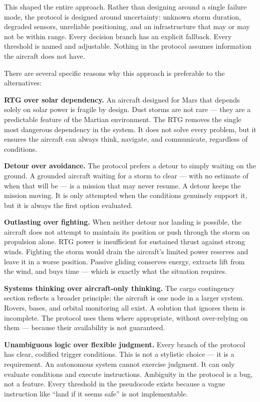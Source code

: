 \documentclass[a4paper,12pt]{article}
\begin{document}
This shaped the entire approach. Rather than designing around a single failure mode, the
protocol is designed around uncertainty: unknown storm duration, degraded sensors, unreliable
positioning, and an infrastructure that may or may not be within range. Every decision branch
has an explicit fallback. Every threshold is named and adjustable. Nothing in the protocol
assumes information the aircraft does not have.

There are several specific reasons why this approach is preferable to the alternatives:

\textbf{RTG over solar dependency.} An aircraft designed for Mars that depends solely on solar
power is fragile by design. Dust storms are not rare — they are a predictable feature of the
Martian environment. The RTG removes the single most dangerous dependency in the system.
It does not solve every problem, but it ensures the aircraft can always think, navigate, and
communicate, regardless of conditions.

\textbf{Detour over avoidance.} The protocol prefers a detour to simply waiting on the ground.
A grounded aircraft waiting for a storm to clear — with no estimate of when that will be —
is a mission that may never resume. A detour keeps the mission moving. It is only attempted
when the conditions genuinely support it, but it is always the first option evaluated.

\textbf{Outlasting over fighting.} When neither detour nor landing is possible, the aircraft
does not attempt to maintain its position or push through the storm on propulsion alone. RTG
power is insufficient for sustained thrust against strong winds. Fighting the storm would
drain the aircraft's limited power reserves and leave it in a worse position. Passive gliding
conserves energy, extracts lift from the wind, and buys time — which is exactly what the
situation requires.

\textbf{Systems thinking over aircraft-only thinking.} The cargo contingency section reflects
a broader principle: the aircraft is one node in a larger system. Rovers, bases, and orbital
monitoring all exist. A solution that ignores them is incomplete. The protocol uses them where
appropriate, without over-relying on them — because their availability is not guaranteed.

\textbf{Unambiguous logic over flexible judgment.} Every branch of the protocol has clear,
codified trigger conditions. This is not a stylistic choice — it is a requirement. An
autonomous system cannot exercise judgment. It can only evaluate conditions and execute
instructions. Ambiguity in the protocol is a bug, not a feature. Every threshold in the
pseudocode exists because a vague instruction like ``land if it seems safe'' is not
implementable.
\end{document}
